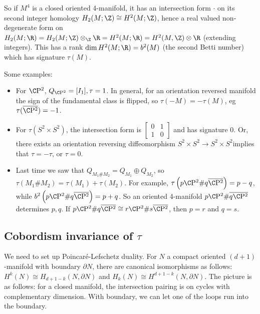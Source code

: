 So if $M^4$ is a closed oriented 4-manifold, it has an intersection form $\cdot $ on its second integer homology $H_2(M; \Z)\cong  H^2(M;\Z)$, hence a real valued non-degenerate form on $H_2(M;\R)=H_2(M;\Z)\otimes_{\Z}\R=H^2(M;\R)=H^2(M,\Z)\otimes \R$ (extending integers). This has a rank $\dim H^2(M;\R)= b^2(M)$ (the second Betti number) which has signature $\tau(M)$. 
 \begin{example}
     Some examples:
     \begin{itemize}
     \setlength\itemsep{-.2em}
         \item For $\C\mathrm{P^2}$, $Q _{\C\mathrm{P^2}}= [I_1], \tau =1$. In general, for an orientation reversed manifold the sign of the fundamental class is flipped, so $\tau(-M)=-\tau(M)$, eg  $\tau(\overline{\C \mathrm{P^2}})= -1$. 
         \item For $\tau(S^2 \times S^2)$, the intersection form is $\left[ 
     \begin{smallmatrix}
         0 & 1 \\ 1 & 0
     \end{smallmatrix}\right] $ and has signature 0. Or, there exists an orientation reversing diffeomorphism $S ^2 \times S^2 \to  S^2 \times S^2 $implies that $\tau = -\tau$, or $\tau =0$.
 \item Last time we saw that $Q _{M_1 \# M_2}= Q _{M_1}\oplus Q_{M_2}$, so $\tau(M_1 \# M_2) = \tau(M_1)+\tau(M_2)$. For example, $\tau\left(p \C\mathrm{P^2}\# q \overline{\C \mathrm{P^2}}\right)=p-q$, while $b^2\left( p \C\mathrm{P^2}\# q \overline{\C \mathrm{P^2}} \right) =p+q$. So an oriented 4-manifold $p \C\mathrm{P^2}\# \overline{q \C \mathrm{P^2}}$ determines $p,q$. If $p \C \mathrm{P^2}\# q \overline{\C \mathrm{P^2}}\cong  r \C \mathrm{P^2}\# s \overline{\C \mathrm{P^2}}$, then $p=r$ and $q=s$.
     \end{itemize}
\end{example}

\subsection{Cobordism invariance of $\tau$}
We need to set up Poincar\'e-Lefschetz duality. For $N$ a compact oriented $(d+1)$-manifold with boundary $\partial N$, there are canonical isomorphisms as follows: $H^k (N) \cong  H _{d+1-k}(N, \partial N)$ and $H_k(N) \cong  H ^{d+1-k}(N,\partial N)$. The picture is as follows: for a closed manifold, the intersection pairing is on cycles with complementary dimension. With boundary, we can let one of the loops run into the boundary.

